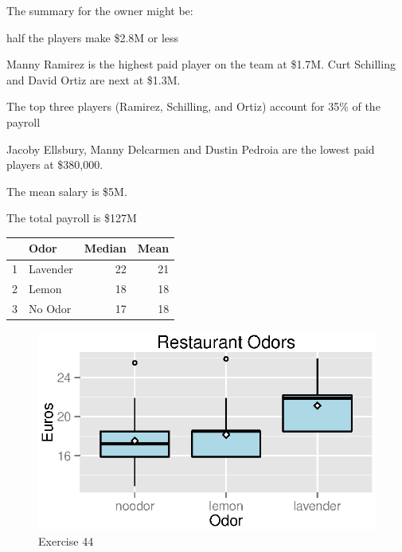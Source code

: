 \documentclass{exam}
\begin{document}
\begin{description}
        The summary for the owner might be:
        \begin{itemize*}
          \item half the players make \$2.8M or less
          \item Manny Ramirez is the highest paid player on the team at \$1.7M.  Curt Schilling and David Ortiz are next
            at \$1.3M.
          \item The top three players (Ramirez, Schilling, and Ortiz) account for 35\% of the payroll
          \item Jacoby Ellsbury, Manny Delcarmen and Dustin Pedroia are the lowest paid players at \$380,000.
          \item The mean salary is \$5M.
          \item The total payroll is \$127M
        \end{itemize*}

      \item[44]
        \begin{table}[H]
          \centering
          \begin{tabular}{rlrr}
            \toprule
              & Odor     & Median & Mean \\
            \midrule
            1 & Lavender & 22     & 21 \\
            2 & Lemon    & 18     & 18 \\
            3 & No Odor  & 17     & 18 \\
            \bottomrule
          \end{tabular}
        \end{table}

        \begin{figure}[H]
          \centering
          \includegraphics{figures/ex44.eps}
          \caption{Exercise 44}
        \end{figure}


\end{description}
\end{document}

